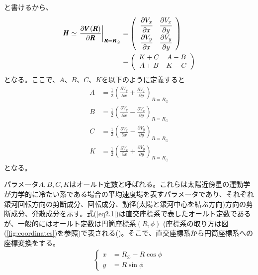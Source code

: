と書けるから、
\begin{align}
\begin{aligned}
	\pmb{H} \simeq
	\left. \frac{\partial \pmb{V}(\pmb{R})}{\partial \pmb{R}} \right|_{\pmb{R}=\pmb{R}_{\odot}}
	&=
	\left(
	\begin{array}{cc}
	 	\cfrac{\partial V_x}{\partial x} & \cfrac{\partial V_x}{\partial y}\\
		\cfrac{\partial V_y}{\partial x} & \cfrac{\partial V_y}{\partial y}\\
	\end{array}
	\right) \\
	&=
	\left(
	\begin{array}{cc}
	 	K+C & A-B\\
		A+B & K-C\\
	\end{array}
	\right)
\end{aligned} \label{eq2}
\end{align}
となる。ここで、$A、B、C、K$を以下のように定義すると
\begin{subequations}
\begin{align}
	A &=\frac{1}{2}\left(\frac{\partial V_y}{\partial x} + \frac{\partial V_x}{\partial y}\right)_{R=R_{\odot}} \label{eq2.1a}\\
	B &=\frac{1}{2}\left(\frac{\partial V_y}{\partial x} - \frac{\partial V_x}{\partial y}\right)_{R=R_{\odot}} \label{eq2.1b}\\
	C &=\frac{1}{2}\left(\frac{\partial V_x}{\partial x} - \frac{\partial V_y}{\partial y}\right)_{R=R_{\odot}} \label{eq2.1c}\\
	K &=\frac{1}{2}\left(\frac{\partial V_x}{\partial x} + \frac{\partial V_y}{\partial y}\right)_{R=R_{\odot}} \label{eq2.1d}
\end{align} \label{eq2.1}
\end{subequations}
となる。

パラメータ$A,B,C,K$はオールト定数と呼ばれる。これらは太陽近傍星の運動学が力学的に冷たい系である場合の平均速度場を表すパラメータであり、それぞれ銀河回転方向の剪断成分、回転成分、動径(太陽と銀河中心を結ぶ方向)方向の剪断成分、発散成分を示す。式(\ref{eq2.1})は直交座標系で表したオールト定数であるが、一般的にはオールト定数は円筒座標系$(R,\phi)$ (座標系の取り方は図(\ref{fig:coordinates})を参照)で表される(\cite{Chandra42})。そこで、直交座標系から円筒座標系への座標変換をする。
\begin{align}
\begin{cases}
	x &= R_{\odot} - R\cos{\phi}\\
	y &= R\sin{\phi}
\end{cases}
\end{align}

